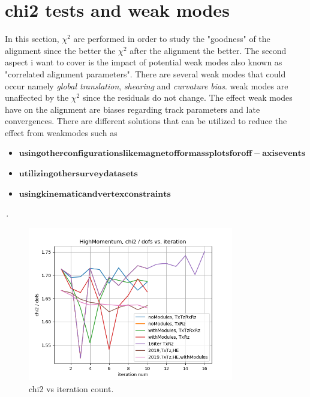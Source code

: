 \section{chi2 tests and weak modes}
In this section, $\chi^2$ are performed in order to study the "goodness" of the alignment since the better the $\chi^2$ after the alignment the better.
The second aspect i want to cover is the impact of potential weak modes also known as "correlated alignment parameters". There are several weak modes that could occur namely \textit{global translation}, \textit{shearing} and \textit{curvature bias}.
weak modes are unaffected by the $\chi^2$ since the residuals do not change.
The effect weak modes have on the alignment are biases regarding track parameters and late convergences.
There are different solutions that can be utilized to reduce the effect from weakmodes such as
\begin{itemize}
  \item $\symbf{using other configurations like magnet off or mass plots for off-axis events}$
  \item $\symbf{utilizing other survey data sets}$
  \item $\symbf{using kinematic and vertex constraints}$
\end{itemize}\,.

\begin{figure}
  \centering
  \includegraphics[width=0.8\textwidth]{plots/nov_19/Figure_2.png}
  \caption{chi2 vs iteration count.}
  \label{fig:fig2}
\end{figure}

